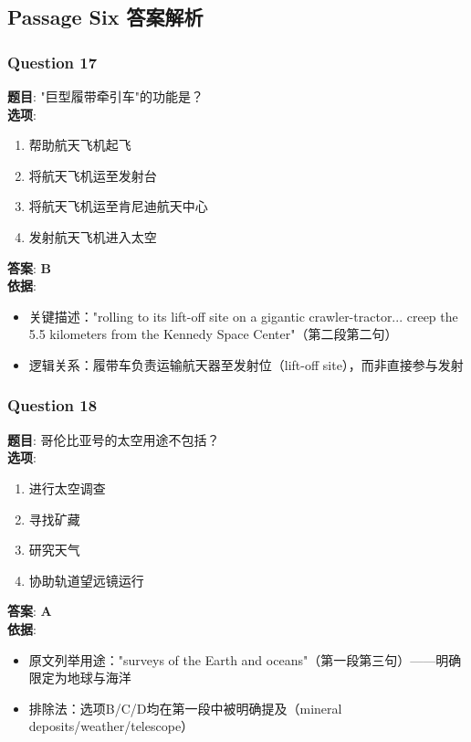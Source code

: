 \documentclass{article}
\begin{document}
\subsection*{Passage Six 答案解析}

\subsubsection*{Question 17}
\textbf{题目}: "巨型履带牵引车"的功能是？ \\
\textbf{选项}: 
\begin{enumerate}[label=\Alph*)]
    \item 帮助航天飞机起飞
    \item 将航天飞机运至发射台
    \item 将航天飞机运至肯尼迪航天中心
    \item 发射航天飞机进入太空
\end{enumerate}
\textbf{答案}: \textbf{B} \\
\textbf{依据}:
\begin{itemize}
    \item 关键描述："rolling to its lift-off site on a gigantic crawler-tractor... creep the 5.5 kilometers from the Kennedy Space Center"（第二段第二句）
    \item 逻辑关系：履带车负责运输航天器至发射位（lift-off site），而非直接参与发射
\end{itemize}

\subsubsection*{Question 18}
\textbf{题目}: 哥伦比亚号的太空用途不包括？ \\
\textbf{选项}: 
\begin{enumerate}[label=\Alph*)]
    \item 进行太空调查
    \item 寻找矿藏
    \item 研究天气
    \item 协助轨道望远镜运行
\end{enumerate}
\textbf{答案}: \textbf{A} \\
\textbf{依据}:
\begin{itemize}
    \item 原文列举用途："surveys of the Earth and oceans"（第一段第三句）——明确限定为地球与海洋
    \item 排除法：选项B/C/D均在第一段中被明确提及（mineral deposits/weather/telescope）
\end{itemize}
\end{document}
